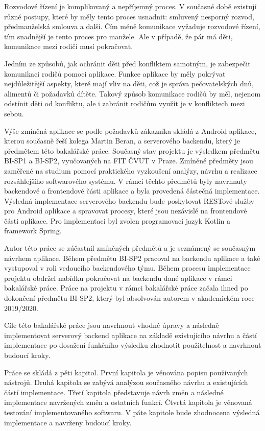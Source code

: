 Rozvodové řízení je komplikovaný a nepříjemný proces. V současné době existují různé postupy, které by měly tento proces usnadnit: smluvený nesporný rozvod, předmanželská smlouva a další. Čím méně komunikace vyžaduje rozvodové řízení, tím snadnější je tento proces pro manžele. Ale v případě, že pár má děti, komunikace mezi rodiči musí pokračovat. 

Jedním ze způsobů, jak ochránit děti před konfliktem samotným, je zabezpečit komunikaci rodičů pomoci aplikace. Funkce aplikace by měly pokrývat nejdůležitější aspekty, které mají vliv na děti, což je správa pečovatelských dnů, alimentů či požadavků dítěte. Takový způsob komunikace rodičů by měl, nejenom odstínit děti od konfliktu, ale i zabránit rodičům využít je v konfliktech mezi sebou.

Výše zmíněná aplikace se podle požadavků zákazníka skládá z Android aplikace, kterou současně řeší kolega Martin Beran, a serverového backendu, který je předmětem této bakalářské práce. Současný stav projektu je výsledkem předmětu BI-SP1 a BI-SP2, vyučovaných na FIT ČVUT v Praze. Zmíněné předměty jsou zaměřené na studium pomocí praktického vyzkoušení analýzy, návrhu a realizace rozsáhlejšího softwarového systému. V rámci těchto předmětů byly navrhnuty backendové a frontendové části aplikace a byla provedená částečná implementace. 
Výsledná implementace serverového backendu bude poskytovat RESTové služby pro Android aplikace a spravovat procesy, které jsou nezávislé na frontendové části aplikace. Pro implementaci byl zvolen programovací jazyk Kotlin a framework Spring. 

Autor této práce se zúčastnil zmíněných předmětů a je seznámený se současným návrhem aplikace. Během předmětu BI-SP2 pracoval na backendu aplikace a také vystupoval v roli vedoucího backendového týmu. Během procesu implementace projektu obdržel nabídku pokračovat na backendu dané aplikace v rámci bakalářské práce. Práce na projektu v rámci bakalářské práce začala ihned po dokončení předmětu BI-SP2, který byl absolvován autorem v akademickém roce 2019/2020.

Cíle této bakalářské práce jsou navrhnout vhodné úpravy a následně implementovat serverový backend aplikace na základě existujícího návrhu a částí implementace po dosažení funkčního výsledku zhodnotit použitelnost a navrhnout budoucí kroky.

Práce se skládá z pěti kapitol. První kapitola je věnována popisu používaných nástrojů. Druhá kapitola se zabývá analýzou současného návrhu a existujících částí implementace. Třetí kapitola představuje návrh změn a následné implementace navržených změn a ostatních funkcí. Čtvrtá kapitola je věnovaná testování implementovaného softwaru. V páte kapitole bude zhodnocena výsledná implementace a navrženy budoucí kroky.






